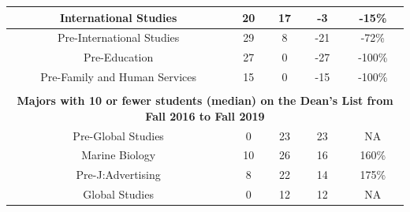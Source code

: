 \documentclass[10pt]{article}
\begin{document}
\begin{longtable}[c]{|ccccc|}
	\multicolumn{1}{|c|}{International Studies}                      & \multicolumn{1}{c|}{20}                              & \multicolumn{1}{c|}{17}                                  & \multicolumn{1}{c|}{-3}                 & -15\%                 \\ \hline
	\multicolumn{1}{|c|}{Pre-International Studies}                  & \multicolumn{1}{c|}{29}                              & \multicolumn{1}{c|}{8}                                   & \multicolumn{1}{c|}{-21}                & -72\%                 \\ \hline
	\multicolumn{1}{|c|}{Pre-Education}                              & \multicolumn{1}{c|}{27}                              & \multicolumn{1}{c|}{0}                                   & \multicolumn{1}{c|}{-27}                & -100\%                \\ \hline
	\multicolumn{1}{|c|}{Pre-Family and Human Services}              & \multicolumn{1}{c|}{15}                              & \multicolumn{1}{c|}{0}                                   & \multicolumn{1}{c|}{-15}                & -100\%                \\ \hline
		\multicolumn{5}{|c|}{\textbf{\qquad}}                                                                                                                              \\ \hline
	\multicolumn{5}{|c|}{\textbf{Majors with 10 or fewer students (median) on the Dean's List from Fall 2016 to Fall 2019}}                                                                                                                              \\ \hline
	\multicolumn{1}{|c|}{Pre-Global Studies}                         & \multicolumn{1}{c|}{0}                               & \multicolumn{1}{c|}{23}                                  & \multicolumn{1}{c|}{23}                 & NA                    \\ \hline
	\multicolumn{1}{|c|}{Marine Biology}                             & \multicolumn{1}{c|}{10}                              & \multicolumn{1}{c|}{26}                                  & \multicolumn{1}{c|}{16}                 & 160\%                 \\ \hline
	\multicolumn{1}{|c|}{Pre-J:Advertising}                          & \multicolumn{1}{c|}{8}                               & \multicolumn{1}{c|}{22}                                  & \multicolumn{1}{c|}{14}                 & 175\%                 \\ \hline
	\multicolumn{1}{|c|}{Global Studies}                             & \multicolumn{1}{c|}{0}                               & \multicolumn{1}{c|}{12}                                  & \multicolumn{1}{c|}{12}                 & NA                    \\ \hline

\end{longtable}
\end{document}
